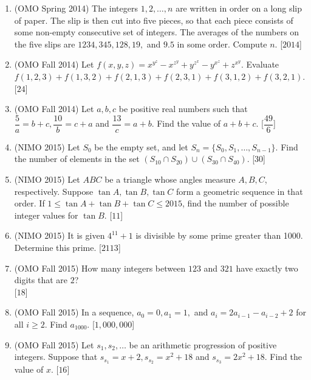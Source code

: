 \documentclass[11pt,paper=letter]{scrartcl}
\begin{document}
\begin{enumerate}
\item (OMO Spring 2014) The integers $1, 2, \ldots, n$ are written in order on a long slip of paper. The slip is then cut into five pieces, so that each piece consists of some non-empty consecutive set of integers. The averages of the numbers on the five slips are $1234, 345, 128, 19,$ and $9.5$ in some order. Compute $n$. \hfill [$2014$]

\item (OMO Fall 2014) Let $f(x, y, z) = x^{y^z} - x^{z^y} + y^{z^x} - y^{x^z} + z^{x^y}$. Evaluate $f(1, 2, 3) + f(1, 3, 2) + f(2, 1, 3) + f(2, 3, 1) + f(3, 1, 2) + f(3, 2, 1)$. \hfill [$24$]

\item (OMO Fall 2014) Let $a, b, c$ be positive real numbers such that $\dfrac{5}{a} = b + c, \dfrac{10}{b} = c + a$ and $\dfrac{13}{c} = a + b$. Find the value of $a + b + c$. \hfill [$\dfrac{49}{6}$]

\item (NIMO 2015) Let $S_0$ be the empty set, and let $S_n = \{S_0, S_1, \ldots, S_{n-1}\}$. Find the number of elements in the set $(S_{10} \cap S_{20}) \cup (S_{30} \cap S_{40})$. \hfill [$30$]

\item (NIMO 2015) Let $ABC$ be a triangle whose angles measure $A, B, C$, respectively. Suppose $\tan A, \tan B, \tan C$ form a geometric sequence in that order. If $1 \leq \tan A + \tan B + \tan C \leq 2015$, find the number of possible integer values for $\tan B$. \hfill [$11$]

\item (NIMO 2015) It is given $4^{11} + 1$ is divisible by some prime greater than 1000. Determine this prime. \hfill [$2113$]

\item (OMO Fall 2015) How many integers between $123$ and $321$ have exactly two digits that are $2$? \\ \phantom{.} \hfill [$18$]

\item (OMO Fall 2015) In a sequence, $a_0 = 0, a_1 = 1,$ and $a_i = 2a_{i-1} - a_{i-2} + 2$ for all $i \geq 2$. Find $a_{1000}$. \hfill [$1,000,000$]

\item (OMO Fall 2015) Let $s_1, s_2, \ldots$ be an arithmetic progression of positive integers. Suppose that $s_{s_1} = x + 2, s_{s_2} = x^2 + 18$ and $s_{s_3} = 2x^2 + 18$. Find the value of $x$. \hfill [$16$]


\end{enumerate}
\end{document}
